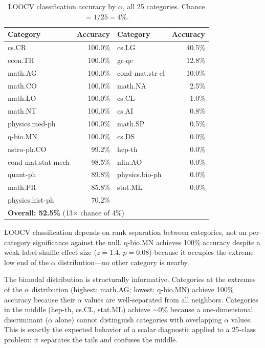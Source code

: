 \documentclass[12pt,letterpaper]{article}
\newcommand{\al}{\alpha}
\begin{document}
\begin{table}[H]
\centering
\caption{LOOCV classification accuracy by $\al$, all 25 categories.
Chance $= 1/25 = 4\%$.}
\label{tab:loocv}
\begin{tabular}{lr|lr}
\toprule
\textbf{Category} & \textbf{Accuracy} & \textbf{Category} &
\textbf{Accuracy} \\
\midrule
cs.CR & 100.0\% & cs.LG & 40.5\% \\
econ.TH & 100.0\% & gr-qc & 12.8\% \\
math.AG & 100.0\% & cond-mat.str-el & 10.0\% \\
math.CO & 100.0\% & math.NA & 2.5\% \\
math.LO & 100.0\% & cs.CL & 1.0\% \\
math.NT & 100.0\% & cs.AI & 0.8\% \\
physics.med-ph & 100.0\% & math.SP & 0.5\% \\
q-bio.MN & 100.0\% & cs.DS & 0.0\% \\
astro-ph.CO & 99.2\% & hep-th & 0.0\% \\
cond-mat.stat-mech & 98.5\% & nlin.AO & 0.0\% \\
quant-ph & 89.8\% & physics.bio-ph & 0.0\% \\
math.PR & 85.8\% & stat.ML & 0.0\% \\
physics.hist-ph & 70.2\% & & \\
\midrule
\multicolumn{4}{l}{\textbf{Overall: 52.5\%}
(13$\times$ chance of 4\%)} \\
\bottomrule
\end{tabular}
\end{table}

LOOCV classification depends on rank separation between categories,
not on per-category significance against the null.  q-bio.MN
achieves 100\% accuracy despite a weak label-shuffle effect size
($z = 1.4$, $p = 0.08$) because it occupies the extreme low end of
the $\al$ distribution---no other category is nearby.

The bimodal distribution is structurally informative.  Categories
at the extremes of the $\al$ distribution (highest: math.AG; lowest:
q-bio.MN) achieve 100\% accuracy because their $\al$ values are
well-separated from all neighbors.  Categories in the middle
(hep-th, cs.CL, stat.ML) achieve $\sim$0\% because a
one-dimensional discriminant ($\al$ alone) cannot distinguish
categories with overlapping $\al$ values.  This is exactly the
expected behavior of a scalar diagnostic applied to a 25-class
problem: it separates the tails and confuses the middle.
\end{document}
